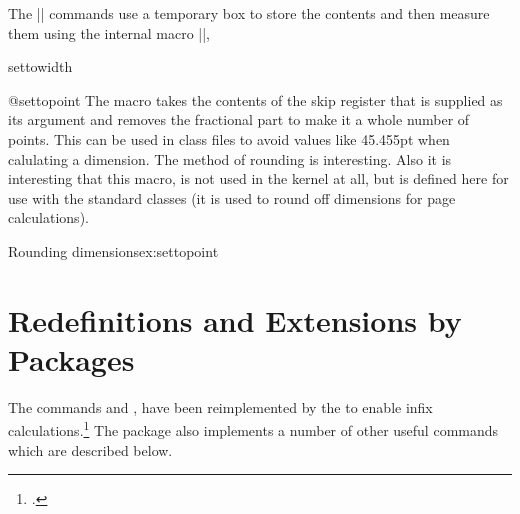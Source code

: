 The |\setto| commands use a temporary box  to store the contents and then 
measure them using the internal macro |\@settodim|,

\medskip
{}
\begin{teX}
  \def\@settodim#1#2#3{\setbox\@tempboxa\hbox{{#3}}#2#1\@tempboxa
        \setbox\@tempboxa\box\voidb@x}
  \def\settoheight{\@settodim\ht}
  \def\settodepth {\@settodim\dp}
\end{teX}

\begin{docCommand}{settowidth}{ }
\begin{teX}  
  \def\settowidth {\@settodim\wd}
\end{teX}
\end{docCommand}


\begin{docCommand}{@settopoint} {}
The 
 macro takes the contents of the skip register that is supplied as its argument
and removes the fractional part to make it a whole number of points. This can be
used in class files to avoid values like 45.455pt when calulating a dimension. The method of
rounding is interesting. Also it is interesting that this macro, is not used in the kernel at all, but is defined
here for use with the standard classes (it is used to round off dimensions for page calculations).
\end{docCommand}

\begin{texexample}{Rounding dimensions}{ex:settopoint}
\bgroup 
  \makeatletter
  \def\@settopoint#1{\divide#1\p@\multiply#1\p@}
  \newlength\@test
  \setlength\@test{19.5pt}
  \@settopoint{\@test}
  \the\@test
  \makeatother
\egroup  
\end{texexample}

\section{Redefinitions and Extensions by Packages}

The commands \cmd{\settolength} and \cmd{\addtolength}, \cmd{\@settodim} have been reimplemented by the  to enable infix calculations.\footcite{calc} The package also implements a number of other useful
commands which are described below. 


